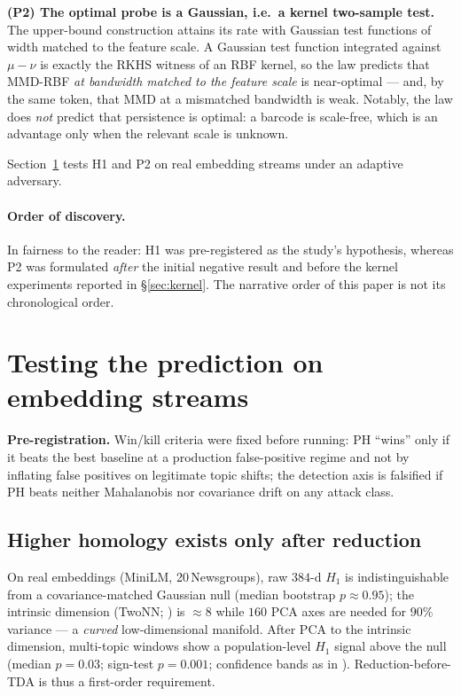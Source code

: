 \documentclass[11pt]{article}
\theoremstyle{remark}
\begin{document}
\textbf{(P2) The optimal probe is a Gaussian, i.e.\ a kernel two-sample test.} The upper-bound
construction attains its rate with Gaussian test functions of width matched to the feature scale.
A Gaussian test function integrated against $\mu-\nu$ is exactly the RKHS witness of an RBF
kernel, so the law predicts that MMD-RBF \emph{at bandwidth matched to the feature scale} is
near-optimal --- and, by the same token, that MMD at a mismatched bandwidth is weak. Notably, the
law does \emph{not} predict that persistence is optimal: a barcode is scale-free, which is an
advantage only when the relevant scale is unknown.

Section~\ref{sec:emp} tests H1 and P2 on real embedding streams under an adaptive adversary.

\paragraph{Order of discovery.} In fairness to the reader: H1 was pre-registered as the study's
hypothesis, whereas P2 was formulated \emph{after} the initial negative result and before the
kernel experiments reported in \S\ref{sec:kernel}. The narrative order of this paper is not its
chronological order.

\section{Testing the prediction on embedding streams}\label{sec:emp}
\textbf{Pre-registration.} Win/kill criteria were fixed before running: PH ``wins'' only if it
beats the best baseline at a production false-positive regime and not by inflating false
positives on legitimate topic shifts; the detection axis is falsified if PH beats neither
Mahalanobis nor covariance drift on any attack class.

\subsection{Higher homology exists only after reduction}\label{sec:reduce}
On real embeddings (MiniLM, 20\,Newsgroups), raw $384$-d $H_1$ is indistinguishable from a
covariance-matched Gaussian null (median bootstrap $p\approx0.95$); the intrinsic dimension
(TwoNN; \citep{facco2017twonn}) is $\approx 8$ while $160$ PCA axes are needed for $90\%$
variance --- a \emph{curved} low-dimensional manifold. After PCA to the intrinsic dimension,
multi-topic windows show a population-level $H_1$ signal above the null (median $p=0.03$;
sign-test $p=0.001$; confidence bands as in \citep{fasy2014confidence}). Reduction-before-TDA
is thus a first-order requirement.
\end{document}
